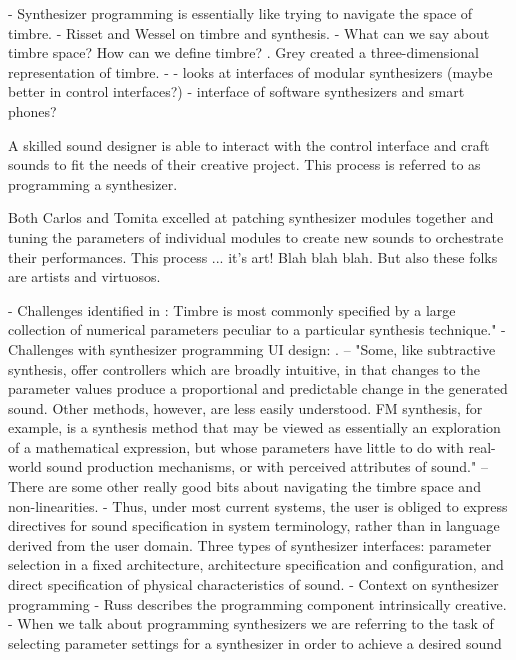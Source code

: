 - Synthesizer programming is essentially like trying to navigate the space of timbre.
- Risset and Wessel \cite{risset1999exploration} on timbre and synthesis.
- What can we say about timbre space? How can we define timbre? \cite{grey1977multidimensional}. Grey created a three-dimensional representation of timbre.
- \cite{bates2021interface} - looks at interfaces of modular synthesizers (maybe better in control interfaces?) 
- \cite{d2016interface} interface of software synthesizers and smart phones?

A skilled sound designer is able to interact with the control interface and craft sounds to fit the needs of their creative project. This process is referred to as programming a synthesizer. 

Both Carlos and Tomita excelled at patching synthesizer modules together and tuning the parameters of individual modules to create new sounds to orchestrate their performances. This process ... it's art! Blah blah blah. But also these folks are artists and virtuosos.

- Challenges identified in \cite{ethington1994seawave}: Timbre is most commonly specified by a large collection of numerical parameters peculiar to a particular synthesis technique."
- Challenges with synthesizer programming UI design: \cite{seago2013new}. -- "Some, like subtractive synthesis, offer controllers which are broadly intuitive, in that changes to the parameter values produce a proportional and predictable change in the generated sound. Other methods, however, are less easily understood. FM synthesis, for example, is a synthesis method that may be viewed as essentially an exploration of a mathematical expression, but whose parameters have little to do with real-world sound production mechanisms, or with perceived attributes of sound." -- There are some other really good bits about navigating the timbre space and non-linearities.
- \cite{seago2004critical} Thus, under most current systems, the user is obliged to express directives for sound specification in system terminology, rather than in language derived from the user domain. Three types of synthesizer interfaces: parameter selection in a fixed architecture, architecture specification and configuration, and direct specification of physical characteristics of sound.
- Context on synthesizer programming \cite{jenkins2019analog}
- Russ describes the programming component intrinsically creative.
- When we talk about programming synthesizers we are referring to the task of selecting parameter settings for a synthesizer in order to achieve a desired sound

